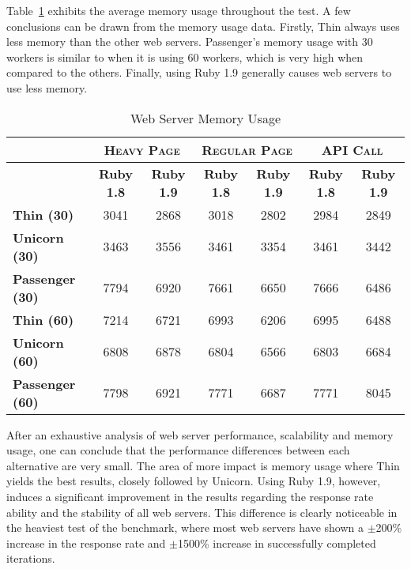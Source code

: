 Table~\ref{tab:web_server_memory_usage} exhibits the average memory usage throughout the test. A few conclusions can be drawn from the memory usage data. Firstly, Thin always uses less memory than the other web servers. Passenger's memory usage with 30 workers is similar to when it is using 60 workers, which is very high when compared to the others. Finally, using Ruby 1.9 generally causes web servers to use less memory.
\begin{table}[h!t]
  \centering
  \caption{Web Server Memory Usage}
  \label{tab:web_server_memory_usage}
  
  \begin{tabular}{l|c|c|c|c|c|c}

     & \multicolumn{2}{c|}{\textbf{\textsc{Heavy Page}}} & \multicolumn{2}{c|}{\textbf{\textsc{Regular Page}}} & \multicolumn{2}{c}{\textbf{\textsc{API Call}}} \\ \hline
     & \textbf{Ruby 1.8} & \textbf{Ruby 1.9} & \textbf{Ruby 1.8} & \textbf{Ruby 1.9} & \textbf{Ruby 1.8} & \textbf{Ruby 1.9} \\ \hline
    \textbf{Thin (30)} & 3041 & 2868 & 3018 & 2802 & 2984 & 2849 \\ \hline
    \textbf{Unicorn (30)} & 3463 & 3556 & 3461 & 3354 & 3461 & 3442 \\ \hline
    \textbf{Passenger (30)} & 7794 & 6920 & 7661 & 6650 & 7666 & 6486 \\ \hline
    \textbf{Thin (60)} & 7214 & 6721 & 6993 & 6206 & 6995 & 6488 \\ \hline
    \textbf{Unicorn (60)} & 6808 & 6878 & 6804 & 6566 & 6803 & 6684 \\ \hline
    \textbf{Passenger (60)} & 7798 & 6921 & 7771 & 6687 & 7771 & 8045 \\
  \end{tabular}
\end{table}

After an exhaustive analysis of web server performance, scalability and memory usage, one can conclude that the performance differences between each alternative are very small. The area of more impact is memory usage where Thin yields the best results, closely followed by Unicorn. Using Ruby 1.9, however, induces a significant improvement in the results regarding the response rate ability and the stability of all web servers. This difference is clearly noticeable in the heaviest test of the benchmark, where most web servers have shown a $\pm$200\% increase in the response rate and $\pm$1500\% increase in successfully completed iterations.

